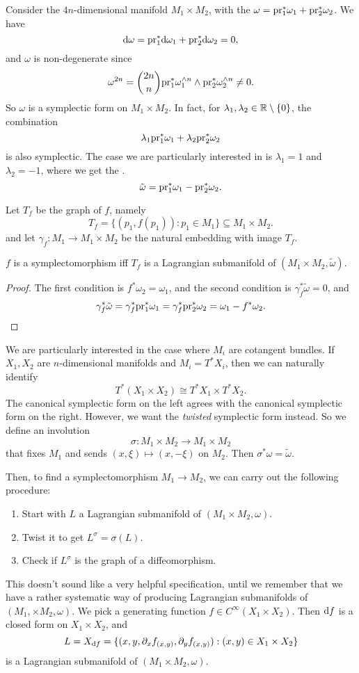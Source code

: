 \documentclass[a4paper]{article}
\begin{document}
Consider the $4n$-dimensional manifold $M_1 \times M_2$, with the  $\omega = \mathrm{pr}_1^* \omega_1 + \mathrm{pr}_2^* \omega_2$. We have
\[
  \mathrm{d} \omega = \mathrm{pr}_1^* \mathrm{d} \omega_1 + \mathrm{pr}_2^* \mathrm{d} \omega_2 = 0,
\]
and $\omega$ is non-degenerate since
\[
  \omega^{2n} = \binom{2n}{n} \mathrm{pr}_1^* \omega_1^{\wedge n} \wedge \mathrm{pr}_2^* \omega_2^{\wedge n} \not= 0.
\]
So $\omega$ is a symplectic form on $M_1 \times M_2$. In fact, for $\lambda_1, \lambda_2 \in \mathbb{R} \setminus \{0\}$, the combination
\[
  \lambda_1 \mathrm{pr}_1^* \omega_1 + \lambda_2 \mathrm{pr}_2^* \omega_2
\]
is also symplectic. The case we are particularly interested in is $\lambda_1 = 1$ and $\lambda_2 = -1$, where we get the \index{$\tilde{\omega}$}.
\[
  \tilde{\omega} = \mathrm{pr}_1^* \omega_1 - \mathrm{pr}_2^* \omega_2.
\]

Let $T_f$ be the graph of $f$, namely
\[
  T_f = \{(p_1, f(p_1)) : p_1 \in M_1\} \subseteq M_1 \times M_2.
\]
and let $\gamma_f: M_1 \to M_1 \times M_2$ be the natural embedding with image $T_f$.

\begin{prop}
  $f$ is a symplectomorphism iff $T_f$ is a Lagrangian submanifold of $(M_1 \times M_2, \tilde{\omega})$.
\end{prop}
\begin{proof}
  The first condition is $f^* \omega_2 = \omega_1$, and the second condition is $\gamma_f^* \tilde{\omega} = 0$, and
  \[
    \gamma_f^* \tilde{\omega} = \gamma_f^* \mathrm{pr}_1^* \omega_1 = \gamma_f^* \mathrm{pr}_2^* \omega_2 = \omega_1 - f^* \omega_2.\qedhere
  \]
\end{proof}

We are particularly interested in the case where $M_i$ are cotangent bundles. If $X_1, X_2$ are $n$-dimensional manifolds and $M_i = T^* X_i$, then we can naturally identify
\[
  T^*(X_1 \times X_2) \cong T^*X_1 \times T^* X_2.
\]
The canonical symplectic form on the left agrees with the canonical symplectic form on the right. However, we want the \emph{twisted} symplectic form instead. So we define an involution
\[
  \sigma: M_1 \times M_2 \to M_1 \times M_2
\]
that fixes $M_1$ and sends $(x, \xi) \mapsto (x, -\xi)$ on $M_2$. Then $\sigma^* \omega = \tilde{\omega}$.

Then, to find a symplectomorphism $M_1 \to M_2$, we can carry out the following procedure:
\begin{enumerate}
  \item Start with $L$ a Lagrangian submanifold of $(M_1 \times M_2, \omega)$.
  \item Twist it to get $L^\sigma = \sigma(L)$.
  \item Check if $L^\sigma$ is the graph of a diffeomorphism.
\end{enumerate}
This doesn't sound like a very helpful specification, until we remember that we have a rather systematic way of producing Lagrangian submanifolds of $(M_1, \times M_2, \omega)$. We pick a generating function $f \in C^\infty(X_1 \times X_2)$. Then $\mathrm{d} f$ is a closed form on $X_1 \times X_2$, and
\[
  L = X_{\mathrm{d} f} = \{(x, y, \partial_x f_{(x, y)}, \partial_y f_{(x, y)}): (x, y) \in X_1 \times X_2\}
\]
is a Lagrangian submanifold of $(M_1 \times M_2, \omega)$.
\end{document}
